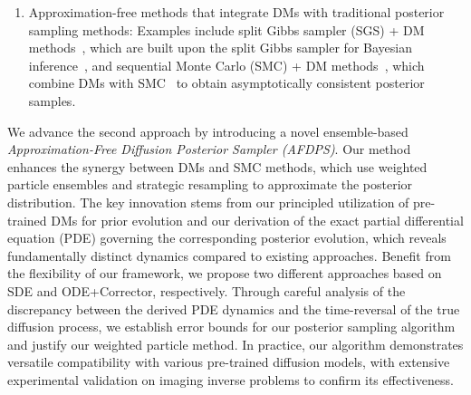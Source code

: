\documentclass{article}
\numberwithin{equation}{section}
\newcommand{\yinuo}[1]{\textcolor{cyan}{(yinuo: #1)}}
\begin{document}
\begin{enumerate}[leftmargin=15pt,itemsep=0pt,topsep=0pt]
    \item Approximation-free methods that integrate DMs with traditional posterior sampling methods: Examples include split Gibbs sampler (SGS) + DM methods~\cite{xu2024provably,wu2024principled,coeurdoux2024plug,zheng2025inversebench}, which are built upon the split Gibbs sampler for Bayesian inference~\cite{vono2019split,pereyra2023split}, and sequential Monte Carlo (SMC) + DM methods~\cite{wu2023practical,cardoso2023monte,dou2024diffusion,kelvinius2025solving,skreta2025feynman,lee2025debiasing,holderrieth2025leaps,achituve2025inverse}, which combine DMs with SMC~\cite{liu2001monte,chopin2002sequential,del2006sequential,doucet2009tutorial,del2013mean,moral2004feynman} to obtain asymptotically consistent posterior samples.

\end{enumerate}


We advance the second approach by introducing a novel ensemble-based \emph{Approximation-Free Diffusion Posterior Sampler (AFDPS)}. Our method enhances the synergy between DMs and SMC methods, which use weighted particle ensembles and strategic resampling to approximate the posterior distribution. The key innovation stems from our principled utilization of pre-trained DMs for prior evolution and our derivation of the exact partial differential equation (PDE) governing the corresponding posterior evolution, which reveals fundamentally distinct dynamics compared to existing approaches. Benefit from the flexibility of our framework, we propose two different approaches based on SDE and ODE+Corrector, respectively. Through careful analysis of the discrepancy between the derived PDE dynamics and the time-reversal of the true diffusion process, we establish error bounds for our posterior sampling algorithm and justify our weighted particle method. In practice, our algorithm demonstrates versatile compatibility with various pre-trained diffusion models, with extensive experimental validation on imaging inverse problems to confirm its effectiveness.
\end{document}
